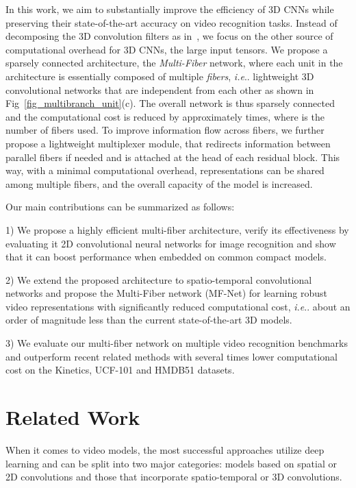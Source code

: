 \documentclass[runningheads]{llncs}
\makeatletter
\newcommand{\ours}[0]{MF-Net\xspace}
\newcommand{\ourslong}[0]{multi-fiber\xspace}
\newcommand{\ourslongcaps}[0]{Multi-Fiber\xspace}
\newcommand{\switch}[0]{multiplexer\xspace}
\DeclareRobustCommand\onedot{\futurelet\@let@token\@onedot}
\def\@onedot{\ifx\@let@token.\else.\null\fi\xspace}
\def\ie{\emph{i.e}\onedot} \def\Ie{\emph{I.e}\onedot}
\makeatother
\begin{document}
In this work, we aim to substantially improve the efficiency of 3D CNNs while preserving their state-of-the-art accuracy on video recognition tasks. Instead of decomposing the 3D convolution filters as in~\cite{tran2017closer,xie2017rethinking}, we focus on the other source of computational overhead for 3D CNNs, the large input tensors. We propose a sparsely connected architecture, the \textit{\ourslongcaps} network, where each unit in the architecture is essentially composed of multiple \textit{fibers}, \ie lightweight 3D convolutional networks that are independent from each other as shown in Fig~\ref{fig_multibranch_unit}(c). The overall network is thus sparsely connected and the computational cost is reduced by approximately  times, where  is the number of fibers used. To improve information flow across fibers, we further propose a lightweight \switch module, that redirects information between parallel fibers if needed and is attached at the head of each residual block. This way, with a minimal computational overhead, representations can be shared among multiple fibers, and the overall capacity of the model is increased. 

Our main contributions can be summarized as follows:

1) We propose a highly efficient \ourslong architecture, verify its effectiveness by evaluating it 2D convolutional neural networks for image recognition and show that it can boost performance when embedded on common compact models.

2) We extend the proposed architecture to spatio-temporal convolutional networks and propose the \ourslongcaps network (\ours) for learning robust video representations with significantly reduced computational cost, \ie about an order of magnitude less than the current state-of-the-art 3D models.

3) We evaluate our \ourslong network on multiple video recognition benchmarks and outperform recent related methods with several times lower computational cost on the Kinetics, UCF-101 and HMDB51 datasets.

 
\section{Related Work}
\label{sec:related}

When it comes to video models, the most successful approaches utilize deep learning and can be split into two major categories: models based on spatial or 2D convolutions and those that incorporate spatio-temporal or 3D convolutions.
\end{document}

